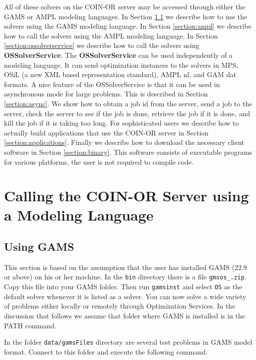 \documentclass[11pt]{article}
\renewcommand{\{}{{\char"7B}}
\renewcommand{\}}{{\char"7D}}
\renewcommand{\^}{{\char"0D}}
\renewcommand{\'}{{\char"0D}}
\begin{document}
All of these solvers on the COIN-OR server may be accessed through either the GAMS or AMPL modeling languages.   In Section \ref{section:gams} we describe how to use the solvers using the GAMS modeling language. In Section \ref{section:ampl} we describe how to call the solvers using the AMPL modeling language.  In Section \ref{section:ossolverservice} we describe how to call the solvers using {\bf OSSolverService}.  The {\bf OSSolverService}  can be used independently of a modeling language.   It can send optimization instances to the solvers in MPS, OSiL (a new XML based representation standard), AMPL nl, and GAM dat formats. A nice feature of the OSSolverService is that it can be used in asynchronous mode for large problems.  This is described in Section \ref{section:async}. We show how to obtain a job id from the server, send a job to the server, check the server to see if the job is done, retrieve the job if it is done, and kill the job if it is taking too long. For sophisticated users we describe how to actually build applications that use the COIN-OR server in Section  \ref{section:applications}.  Finally we   describe how to download the necessary client software in Section \ref{section:binary}.    This software consists of executable programs for various platforms, the user is not required to compile code. 

\section{Calling the COIN-OR  Server using a Modeling Language}\label{section:modellanguage}


\subsection{Using GAMS}\label{section:gams}

This section is based on the assumption that the user has installed GAMS (22.9 or above) on his or her machine.   In the {\tt bin}  directory there is a file {\tt gmsos\_.zip}. Copy this file into your GAMS folder. Then run {\tt gamsinst} and select {\tt OS}  as the default solver whenever it is listed as a solver.   You can now solve  a wide variety of  problems either locally or remotely through Optimization Services. In the discussion that follows we assume that folder where GAMS is installed is in the PATH command.


In  the folder {\tt data/gamsFiles} directory are several test problems in GAMS model format.  Connect to this folder and execute the following command.
\end{document}
